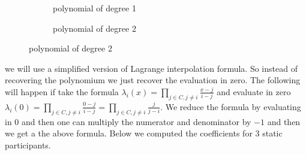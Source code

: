\begin{figure}[H]
    \centering
    \captionsetup[subfigure]{labelformat=empty}
    \begin{subfigure}[b]{0.3\textwidth}
        \caption{polynomial of degree 1}
    \end{subfigure}
    \qquad %
    \qquad %
    \qquad %
    \qquad %
    \begin{subfigure}[b]{0.3\textwidth}
        \caption{polynomial of degree 2}
    \end{subfigure}
\end{figure}


 we will use a simplified version of Lagrange interpolation formula. So instead of recovering the polynomium we just recover the evaluation in zero. The following will happen if take the formula \begin{math} \lambda_i(x)=\prod\limits_{j\in C,j\neq i}  \frac{x-j}{i-j} \end{math} and evaluate in zero \begin{math} \lambda_i(0)=\prod\limits_{j\in C,j\neq i}  \frac{0-j}{i-j} = \prod\limits_{j\in C,j\neq i} \frac{j}{j-i} \end{math}. We reduce the formula by evaluating in $0$ and then one can multiply the numerator and denominator by $-1$ and then we get a the above formula. Below we computed the coefficients for 3 static participants.


